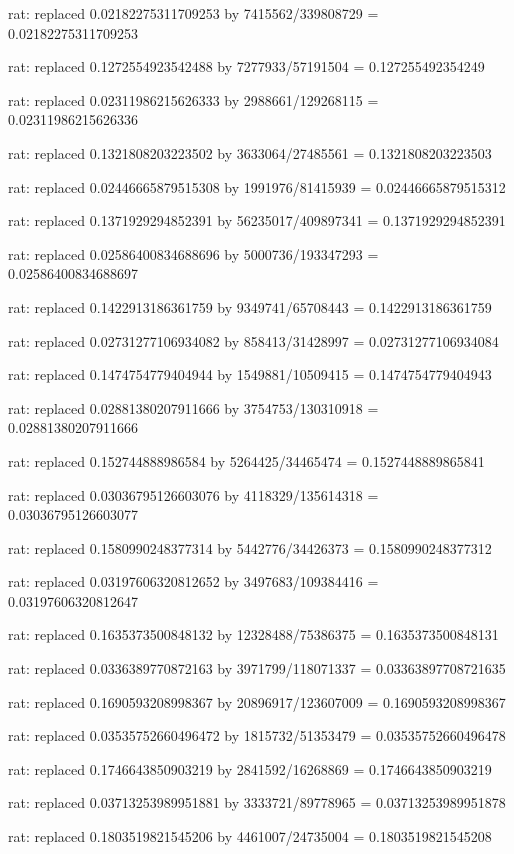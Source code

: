 \documentclass[a4paper,10pt]{article}
\begin{document}
\begin{eulernotebook}
\begin{eulercomment}
\begin{eulercomment}
\begin{eulercomment}
\begin{eulercomment}
\begin{eulercomment}
\begin{eulercomment}
\begin{eulercomment}
\begin{eulercomment}
\begin{eulercomment}
\begin{eulercomment}
\begin{eulercomment}
\begin{eulercomment}
\begin{eulercomment}
\begin{eulercomment}
\begin{eulercomment}
\begin{eulercomment}
\begin{euleroutput}
  rat: replaced 0.02182275311709253 by 7415562/339808729 = 0.02182275311709253
  
  rat: replaced 0.1272554923542488 by 7277933/57191504 = 0.127255492354249
  
  rat: replaced 0.02311986215626333 by 2988661/129268115 = 0.02311986215626336
  
  rat: replaced 0.1321808203223502 by 3633064/27485561 = 0.1321808203223503
  
  rat: replaced 0.02446665879515308 by 1991976/81415939 = 0.02446665879515312
  
  rat: replaced 0.1371929294852391 by 56235017/409897341 = 0.1371929294852391
  
  rat: replaced 0.02586400834688696 by 5000736/193347293 = 0.02586400834688697
  
  rat: replaced 0.1422913186361759 by 9349741/65708443 = 0.1422913186361759
  
  rat: replaced 0.02731277106934082 by 858413/31428997 = 0.02731277106934084
  
  rat: replaced 0.1474754779404944 by 1549881/10509415 = 0.1474754779404943
  
  rat: replaced 0.02881380207911666 by 3754753/130310918 = 0.02881380207911666
  
  rat: replaced 0.152744888986584 by 5264425/34465474 = 0.1527448889865841
  
  rat: replaced 0.03036795126603076 by 4118329/135614318 = 0.03036795126603077
  
  rat: replaced 0.1580990248377314 by 5442776/34426373 = 0.1580990248377312
  
  rat: replaced 0.03197606320812652 by 3497683/109384416 = 0.03197606320812647
  
  rat: replaced 0.1635373500848132 by 12328488/75386375 = 0.1635373500848131
  
  rat: replaced 0.0336389770872163 by 3971799/118071337 = 0.03363897708721635
  
  rat: replaced 0.1690593208998367 by 20896917/123607009 = 0.1690593208998367
  
  rat: replaced 0.03535752660496472 by 1815732/51353479 = 0.03535752660496478
  
  rat: replaced 0.1746643850903219 by 2841592/16268869 = 0.1746643850903219
  
  rat: replaced 0.03713253989951881 by 3333721/89778965 = 0.03713253989951878
  
  rat: replaced 0.1803519821545206 by 4461007/24735004 = 0.1803519821545208
  

\end{euleroutput}
\end{eulercomment}
\end{eulercomment}
\end{eulercomment}
\end{eulercomment}
\end{eulercomment}
\end{eulercomment}
\end{eulercomment}
\end{eulercomment}
\end{eulercomment}
\end{eulercomment}
\end{eulercomment}
\end{eulercomment}
\end{eulercomment}
\end{eulercomment}
\end{eulercomment}
\end{eulercomment}
\end{eulernotebook}
\end{document}

